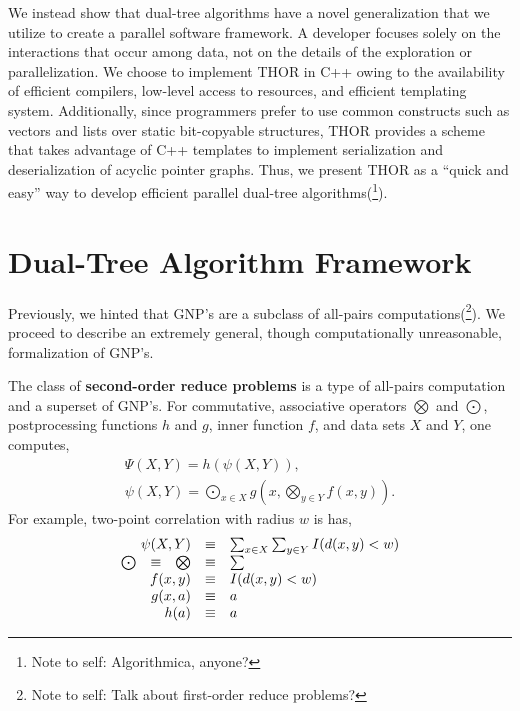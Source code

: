 \documentclass[twoside,leqno,twocolumn]{article}
\newcommand{\authornote}[1]{(\footnote{Note to self: #1})}
\newcommand{\authorsnote}[1]{\authornote{#1}}
\newcommand{\Gnp}{\Psi}
\newcommand{\gnp}{\psi}
\newcommand{\defterm}[1]{{\bf #1}}
\begin{document}
We instead show that dual-tree algorithms have a novel generalization that we utilize to create a parallel software framework.
A developer focuses solely on the interactions that occur among data, not on the details of the exploration or parallelization.
We choose to implement THOR in C++ owing to the availability of efficient compilers, low-level access to resources, and efficient templating system.
Additionally, since programmers prefer to use common constructs such as vectors and lists over static bit-copyable structures, THOR provides a scheme that takes advantage of C++ templates to implement serialization and deserialization of acyclic pointer graphs.
Thus, we present THOR as a ``quick and easy'' way to develop efficient parallel dual-tree algorithms\authorsnote{Algorithmica, anyone?}.

\section{Dual-Tree Algorithm Framework}

Previously, we hinted that GNP's are a subclass of all-pairs computations\authorsnote{Talk about first-order reduce problems?}.
We proceed to describe an extremely general, though computationally unreasonable, formalization of GNP's.

The class of \defterm{second-order reduce problems} is a type of all-pairs computation and a superset of GNP's.
For commutative, associative operators $\bigotimes$ and $\bigodot$, postprocessing functions $h$ and $g$, inner function $f$, and data sets $X$ and $Y$, one computes,
\[\begin{array}{l}
  \displaystyle \Gnp(X, Y) = h(\gnp(X, Y)),
  \\
  \displaystyle \gnp(X, Y) = \bigodot_{x \in X} g\!\left(x, \bigotimes_{y \in Y} f(x, y) \right).
\end{array}\]
\noindent
For example, two-point correlation with radius $w$ is has,
\[\begin{array}{ccccl}
  \multicolumn{3}{r}{\gnp(X, Y)} &\equiv& \sum_{x \in X} \sum_{y \in Y} I(d(x, y) < w)
  \\
  \bigodot &\equiv& \bigotimes &\equiv& \sum
  \\
  \multicolumn{3}{r}{f(x,y)} &\equiv& I(d(x,y) < w)
  \\
  \multicolumn{3}{r}{g(x, a)} &\equiv& a
  \\
  \multicolumn{3}{r}{h(a)} &\equiv& a
\end{array}\]
\end{document}
